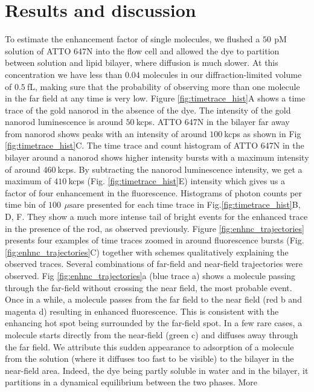 \documentclass[journal=jpccck,manuscript=article]{achemso}
\newcommand{\pM}{\ensuremath{\,\textrm{pM}}}
\newcommand{\us}{\ensuremath{\,\mu\textrm{s}}}
\begin{document}
\section{Results and discussion}
To estimate the enhancement factor of single molecules, we flushed a $50~$\pM solution of ATTO 647N into the 
flow cell and allowed the dye to partition between solution and lipid bilayer, where diffusion is much slower. 
At this concentration we have less than $0.04$ molecules in our diffraction-limited volume of $0.5~$fL, making sure 
that the probability of observing more than one molecule in the far field at any time is very low. 
Figure \ref{fig:timetrace_hist}A shows a time trace of the gold nanorod in the absence of the dye. The intensity of 
the gold nanorod luminescence is around $50~$kcps. ATTO 647N in the bilayer far away from nanorod shows peaks with an 
intensity of around $100~$kcps as shown in Fig \ref{fig:timetrace_hist}C. The time trace and count histogram of 
ATTO 647N in the bilayer around a nanorod shows higher intensity bursts with a maximum intensity of around $460~$kcps. 
By subtracting the nanorod luminescence intensity, we get a maximum of $410~$kcps (Fig. \ref{fig:timetrace_hist}E) 
intensity which gives us a factor of four enhancement in the fluorescence. Histograms of photon counts per time 
bin of $100~$\us are presented for each time trace in Fig.\ref{fig:timetrace_hist}B, D, F. They show a much more 
intense tail of bright events for the enhanced trace in the presence of the rod, as observed 
previously.\cite{khatua2014resonant} Figure \ref{fig:enhnc_trajectories} presents four examples of time traces zoomed 
in around fluorescence bursts (Fig. \ref{fig:enhnc_trajectories}C) together with schemes qualitatively explaining 
the observed traces. Several combinations of far-field and near-field trajectories were observed. 
Fig \ref{fig:enhnc_trajectories}a (blue trace a) shows a molecule passing through the far-field without crossing the 
near field, the most probable event. Once in a while, a molecule passes from the far field to the near 
field (red b and magenta d) resulting in enhanced fluorescence. This is consistent with the enhancing hot spot being 
surrounded by the far-field spot. In a few rare cases, a molecule starts directly from the near-field (green c) and 
diffuses away through the far field. We attribute this sudden appearance to adsorption of a molecule from the 
solution (where it diffuses too fast to be visible) to the bilayer in the near-field area. Indeed, the dye being 
partly soluble in water and in the bilayer, it partitions in a dynamical equilibrium between the two phases. More 
\end{document}
